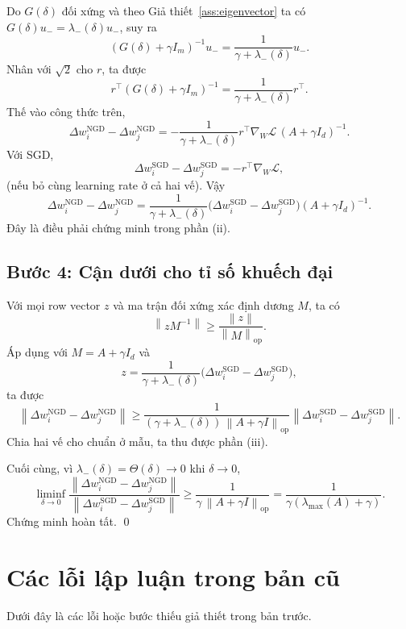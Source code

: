 \documentclass[11pt,a4paper]{article}
\newcommand{\cL}{\mathcal L}
\newcommand{\norm}[1]{\left\lVert #1 \right\rVert}
\DeclareMathOperator{\op}{op}
\begin{document}
Do $G(\delta)$ đối xứng và theo Giả thiết~\ref{ass:eigenvector} ta có
$G(\delta)u_- = \lambda_-(\delta)u_-$, suy ra
\[
(G(\delta)+\gamma I_m)^{-1}u_-
=
\frac{1}{\gamma+\lambda_-(\delta)}u_-.
\]
Nhân với $\sqrt 2$ cho $r$, ta được
\[
r^\top (G(\delta)+\gamma I_m)^{-1}
=
\frac{1}{\gamma+\lambda_-(\delta)}r^\top.
\]
Thế vào công thức trên,
\[
\Delta w_i^{\mathrm{NGD}} - \Delta w_j^{\mathrm{NGD}}
=
-\frac{1}{\gamma+\lambda_-(\delta)}
r^\top \nabla_W \cL\,(A+\gamma I_d)^{-1}.
\]
Với SGD,
\[
\Delta w_i^{\mathrm{SGD}} - \Delta w_j^{\mathrm{SGD}}
=
-r^\top \nabla_W \cL,
\]
(nếu bỏ cùng learning rate ở cả hai vế). Vậy
\[
\Delta w_i^{\mathrm{NGD}} - \Delta w_j^{\mathrm{NGD}}
=
\frac{1}{\gamma+\lambda_-(\delta)}
\bigl(\Delta w_i^{\mathrm{SGD}} - \Delta w_j^{\mathrm{SGD}}\bigr)
(A+\gamma I_d)^{-1}.
\]
Đây là điều phải chứng minh trong phần (ii).

\subsection*{Bước 4: Cận dưới cho tỉ số khuếch đại}

Với mọi row vector $z$ và ma trận đối xứng xác định dương $M$, ta có
\[
\norm{zM^{-1}} \ge \frac{\norm{z}}{\norm{M}_{\op}}.
\]
Áp dụng với $M=A+\gamma I_d$ và
\[
z = \frac{1}{\gamma+\lambda_-(\delta)}
\bigl(\Delta w_i^{\mathrm{SGD}} - \Delta w_j^{\mathrm{SGD}}\bigr),
\]
ta được
\[
\norm{\Delta w_i^{\mathrm{NGD}} - \Delta w_j^{\mathrm{NGD}}}
\ge
\frac{1}{(\gamma+\lambda_-(\delta))\,\norm{A+\gamma I}_{\op}}
\norm{\Delta w_i^{\mathrm{SGD}} - \Delta w_j^{\mathrm{SGD}}}.
\]
Chia hai vế cho chuẩn ở mẫu, ta thu được phần (iii).

Cuối cùng, vì $\lambda_-(\delta)=\Theta(\delta) \to 0$ khi $\delta \to 0$,
\[
\liminf_{\delta \to 0}
\frac{\norm{\Delta w_i^{\mathrm{NGD}} - \Delta w_j^{\mathrm{NGD}}}}
     {\norm{\Delta w_i^{\mathrm{SGD}} - \Delta w_j^{\mathrm{SGD}}}}
\ge
\frac{1}{\gamma\,\norm{A+\gamma I}_{\op}}
=
\frac{1}{\gamma(\lambda_{\max}(A)+\gamma)}.
\]
Chứng minh hoàn tất. \qed

\section{Các lỗi lập luận trong bản cũ}

Dưới đây là các lỗi hoặc bước thiếu giả thiết trong bản trước.
\end{document}
